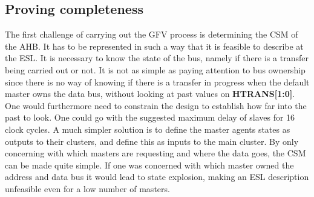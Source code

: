 \subsection{Proving completeness}
The first challenge of carrying out the GFV process is determining the CSM of the AHB. It has to be represented in such a way that it is feasible to describe at the ESL. It is necessary to know the state of the bus, namely if there is a transfer being carried out or not. It is not as simple as paying attention to bus ownership since there is no way of knowing if there is a transfer in progress when the default master owns the data bus, without looking at past values on \textbf{HTRANS[1:0]}. One would furthermore need to constrain the design to establish how far into the past to look. One could go with the suggested maximum delay of slaves for 16 clock cycles. A much simpler solution is to define the master agents states as outputs to their clusters, and define this as inputs to the main cluster. By only concerning with which masters are requesting and where the data goes, the CSM can be made quite simple. If one was concerned with which master owned the address and data bus it would lead to state explosion, making an ESL description unfeasible even for a low number of masters.     

